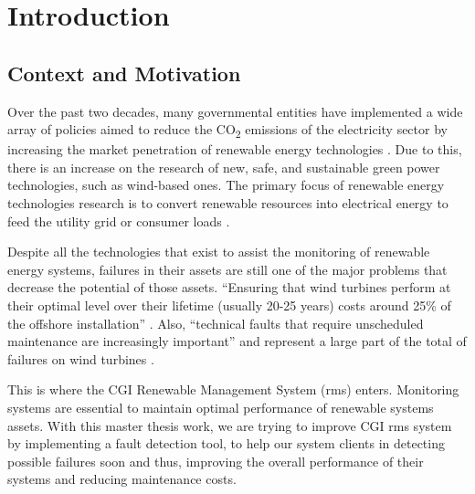 


\chapter{Introduction}
\label{cha:introduction}

\section{Context and Motivation} 
\label{sub:if_you_use_this_template} 

Over the past two decades, many governmental entities have implemented a wide array of policies aimed to reduce the CO\textsubscript{2} emissions of the electricity sector by increasing the market penetration of renewable energy technologies \cite{OLD_3_GENERAL}. Due to this, there is an increase on the research of new, safe, and sustainable green power technologies, such as wind-based ones. The primary focus of renewable energy technologies research is to convert renewable resources into electrical energy to feed the utility grid or consumer loads \cite{OLD_1_SOLAR}.

Despite all the technologies that exist to assist the monitoring of renewable energy systems, failures in their assets are still one of the major problems that decrease the potential of those assets. “Ensuring that wind turbines perform at their optimal level over their lifetime (usually 20-25 years) costs around 25\% of the offshore installation” \cite{OLD_15_WIND}. Also, “technical faults that require unscheduled maintenance are increasingly important” and represent a large part of the total of failures on wind turbines \cite{OLD_18_WIND}.

This is where the CGI Renewable Management System (\acrshort{rms}) enters. Monitoring systems are essential to maintain optimal performance of renewable systems assets. With this master thesis work, we are trying to improve CGI \acrshort{rms} system by implementing a fault detection tool, to help our system clients in detecting possible failures soon and thus, improving the overall performance of their systems and reducing maintenance costs.


